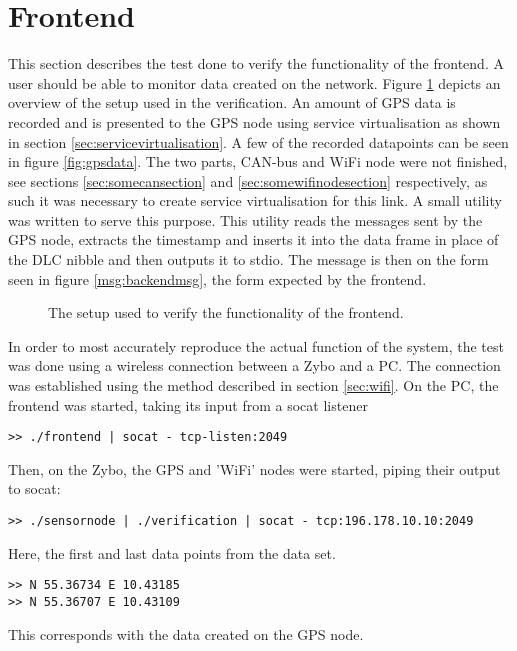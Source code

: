 
\section{Frontend}
This section describes the test done to verify the functionality of the frontend.
A user should be able to monitor data created on the network.
Figure \ref{fig:frontendsetup} depicts an overview of the setup used in the verification.
An amount of GPS data is recorded and is presented to the GPS node using service virtualisation as shown in section \ref{sec:servicevirtualisation}.
A few of the recorded datapoints can be seen in figure \ref{fig:gpsdata}.
The two parts, CAN-bus and WiFi node were not finished, see sections \ref{sec:somecansection} and \ref{sec:somewifinodesection} respectively, as such it was necessary to create service virtualisation for this link.
A small utility was written to serve this purpose.
This utility reads the messages sent by the GPS node, extracts the timestamp and inserts it into the data frame in place of the DLC nibble and then outputs it to stdio.
The message is then on the form seen in figure \ref{msg:backendmsg}, the form expected by the frontend.

\begin{figure}
	\caption{The setup used to verify the functionality of the frontend.}
	\label{fig:frontendsetup}
\end{figure}

In order to most accurately reproduce the actual function of the system, the test was done using a wireless connection between a Zybo and a PC.
The connection was established using the method described in section \ref{sec:wifi}.
On the PC, the frontend was started, taking its input from a socat listener
\begin{lstlisting}
>> ./frontend | socat - tcp-listen:2049
\end{lstlisting}
Then, on the Zybo, the GPS and 'WiFi' nodes were started, piping their output to socat:
\begin{lstlisting}
>> ./sensornode | ./verification | socat - tcp:196.178.10.10:2049
\end{lstlisting}
Here, the first and last data points from the data set.
\begin{lstlisting}
>> N 55.36734 E 10.43185
>> N 55.36707 E 10.43109
\end{lstlisting}
This corresponds with the data created on the GPS node.
